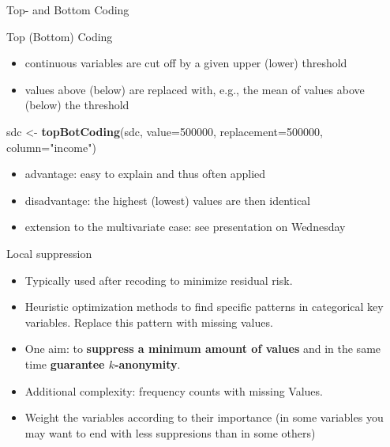 \documentclass[ignorenonframetext,]{beamer}
\newenvironment{Shaded}{\begin{snugshade}}{\end{snugshade}}
\newcommand{\DataTypeTok}[1]{\textcolor[rgb]{0.13,0.29,0.53}{#1}}
\newcommand{\DecValTok}[1]{\textcolor[rgb]{0.00,0.00,0.81}{#1}}
\newcommand{\KeywordTok}[1]{\textcolor[rgb]{0.13,0.29,0.53}{\textbf{#1}}}
\newcommand{\NormalTok}[1]{#1}
\newcommand{\StringTok}[1]{\textcolor[rgb]{0.31,0.60,0.02}{#1}}
\providecommand{\tightlist}{%
  \setlength{\itemsep}{0pt}\setlength{\parskip}{0pt}}
\begin{document}
\begin{frame}[fragile]{Top- and Bottom Coding}
\protect\hypertarget{top--and-bottom-coding}{}

Top (Bottom) Coding

\begin{itemize}
\tightlist
\item
  continuous variables are cut off by a given upper (lower) threshold
\item
  values above (below) are replaced with, e.g., the mean of values above
  (below) the threshold
\end{itemize}

\begin{Shaded}
\begin{Highlighting}[]
\NormalTok{sdc <-}\StringTok{ }\KeywordTok{topBotCoding}\NormalTok{(sdc, }\DataTypeTok{value=}\DecValTok{500000}\NormalTok{, }\DataTypeTok{replacement=}\DecValTok{500000}\NormalTok{, }
                    \DataTypeTok{column=}\StringTok{"income"}\NormalTok{)}
\end{Highlighting}
\end{Shaded}

\begin{itemize}
\tightlist
\item
  advantage: easy to explain and thus often applied
\item
  disadvantage: the highest (lowest) values are then identical
\item
  extension to the multivariate case: see presentation on Wednesday
\end{itemize}

\end{frame}

\begin{frame}{Local suppression}
\protect\hypertarget{local-suppression}{}

\begin{itemize}
\tightlist
\item
  Typically used after recoding to minimize residual risk.
\item
  Heuristic optimization methods to find specific patterns in
  categorical key variables. Replace this pattern with missing values.
\item
  One aim: to \textbf{suppress a minimum amount of values} and in the
  same time \textbf{guarantee $k$-anonymity}.
\item
  Additional complexity: frequency counts with missing Values.
\item
  Weight the variables according to their importance (in some variables
  you may want to end with less suppresions than in some others)
\end{itemize}

\end{frame}
\end{document}
